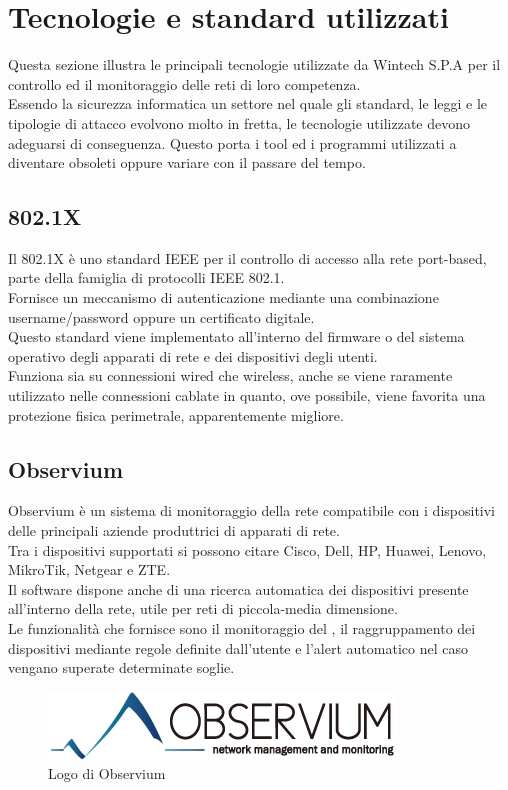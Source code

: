 \documentclass[Tesi.tex]{subfiles}
\begin{document}
\section{Tecnologie e standard utilizzati}
Questa sezione illustra le principali tecnologie utilizzate da Wintech S.P.A per il controllo ed il monitoraggio delle reti di loro competenza. \\
Essendo la sicurezza informatica un settore nel quale gli standard, le leggi e le tipologie di attacco evolvono molto in fretta, le tecnologie utilizzate devono adeguarsi di conseguenza. Questo porta i tool ed i programmi utilizzati a diventare obsoleti oppure variare con il passare del tempo.
\subsection{802.1X}
Il 802.1X è uno standard IEEE per il controllo di accesso alla rete port-based, parte della famiglia di protocolli IEEE 802.1.\\
Fornisce un meccanismo di autenticazione mediante una combinazione username/password oppure un certificato digitale.\\
Questo standard viene implementato all'interno del firmware o del sistema operativo degli apparati di rete e dei dispositivi degli utenti.\\
Funziona sia su connessioni wired che wireless, anche se viene raramente utilizzato nelle connessioni cablate in quanto, ove possibile, viene favorita una protezione fisica perimetrale, apparentemente migliore.

\subsection{Observium}
Observium è un sistema di monitoraggio della rete compatibile con i dispositivi delle principali aziende produttrici di apparati di rete. \\
Tra i dispositivi supportati si possono citare Cisco, Dell, HP, Huawei, Lenovo, MikroTik, Netgear e ZTE. \\
Il software dispone anche di una ricerca automatica dei dispositivi presente all'interno della rete, utile per reti di piccola-media dimensione. \\
Le funzionalità che fornisce sono il monitoraggio del , il raggruppamento dei dispositivi mediante regole definite dall'utente e l'alert automatico nel caso vengano superate determinate soglie.
\begin{figure}[H]
	\centering
	\includegraphics[width=0.5\linewidth]{"images/logo/Observium_logo"}
	\caption{Logo di Observium}
	\label{fig:Logo di Observium}
\end{figure}
\end{document}
